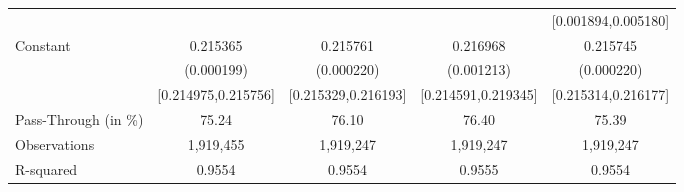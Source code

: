 {\begin{tabular}{l*{4}{c}}
                    &                     &                     &                     &[0.001894,0.005180]         \\
Constant            &    0.215365\sym{***}&    0.215761\sym{***}&    0.216968\sym{***}&    0.215745\sym{***}\\
                    &  (0.000199)         &  (0.000220)         &  (0.001213)         &  (0.000220)         \\
                    &[0.214975,0.215756]         &[0.215329,0.216193]         &[0.214591,0.219345]         &[0.215314,0.216177]         \\
\midrule
Pass-Through (in \%)&       75.24         &       76.10         &       76.40         &       75.39         \\
Observations        &   1,919,455         &   1,919,247         &   1,919,247         &   1,919,247         \\
R-squared           &      0.9554         &      0.9554         &      0.9555         &      0.9554         \\
\bottomrule
\end{tabular}
}
